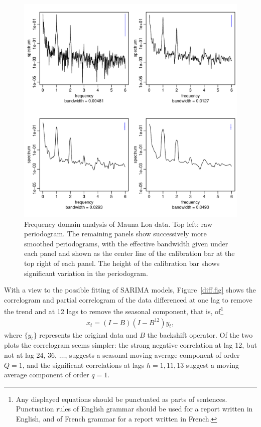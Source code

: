 \documentclass[a4paper,11pt]{article}\usepackage[]{graphicx}\usepackage[]{color}
\makeatletter
\def\maxwidth{ %
  \ifdim\Gin@nat@width>\linewidth
    \linewidth
  \else
    \Gin@nat@width
  \fi
}
\newenvironment{knitrout}{}{} %
\makeatother
\begin{document}
\begin{figure}[htbp]
\begin{center}
\begin{knitrout}
\color{fgcolor}
\includegraphics[width=\maxwidth]{figure/CO2-spectrum-1} 

\end{knitrout}
\end{center}
\caption{Frequency domain analysis of Mauna Loa data.  Top left: raw periodogram. The remaining panels show successively more smoothed periodograms, with the effective bandwidth given under each panel and shown as the center line of the calibration bar at the top right of each panel.  The height of the calibration bar shows significant variation in the periodogram.}
\label{spec.fig}
\end{figure}

With a view to the possible fitting of SARIMA models, Figure~\ref{diff.fig} shows the correlogram and partial correlogram of the data differenced at one lag to remove the trend and at 12 lags to remove the seasonal component, that is, of\footnote{Any displayed equations should be punctuated as parts of sentences.  Punctuation rules of English grammar should be used for a report written in English, and of French grammar for a report written in French.}
\begin{align}
\label{x.eqn}
x_t=(I-B)(I-B^{12})y_t,
\end{align}
where $\{y_t\}$ represents the original data and $B$ the backshift operator.  Of the two plots the correlogram  seems simpler: the strong negative correlation at lag 12, but not at lag 24, 36, $\ldots$, suggests a seasonal moving average component of order $Q=1$, and the significant correlations at lags $h=1, 11, 13$ suggest a moving average component of order $q=1$.  
\end{document}
